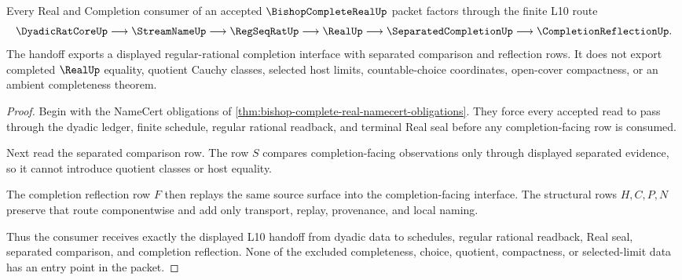 \begin{theorem}
\label{thm:bishop-complete-real-l10-handoff}
Every Real and Completion consumer of an accepted $\BishopCompleteRealUp$ packet factors through the finite L10 route
$$
\DyadicRatCoreUp \longrightarrow \StreamNameUp \longrightarrow \RegSeqRatUp \longrightarrow \RealUp \longrightarrow \SeparatedCompletionUp \longrightarrow \CompletionReflectionUp .
$$
The handoff exports a displayed regular-rational completion interface with separated comparison and reflection rows. It does not export completed $\RealUp$ equality, quotient Cauchy classes, selected host limits, countable-choice coordinates, open-cover compactness, or an ambient completeness theorem.
\end{theorem}
\begin{proof}
Begin with the NameCert obligations of \autoref{thm:bishop-complete-real-namecert-obligations}. They force every accepted read to pass through the dyadic ledger, finite schedule, regular rational readback, and terminal Real seal before any completion-facing row is consumed.

Next read the separated comparison row. The row $S$ compares completion-facing observations only through displayed separated evidence, so it cannot introduce quotient classes or host equality.

The completion reflection row $F$ then replays the same source surface into the completion-facing interface. The structural rows $H,C,P,N$ preserve that route componentwise and add only transport, replay, provenance, and local naming.

Thus the consumer receives exactly the displayed L10 handoff from dyadic data to schedules, regular rational readback, Real seal, separated comparison, and completion reflection. None of the excluded completeness, choice, quotient, compactness, or selected-limit data has an entry point in the packet.
\end{proof}

\begin{closurestatus}{\BishopCompleteRealUp}
  \theoryclosure{\seedClosure}
  \formalstatus{\unformalizedV}
\end{closurestatus}
